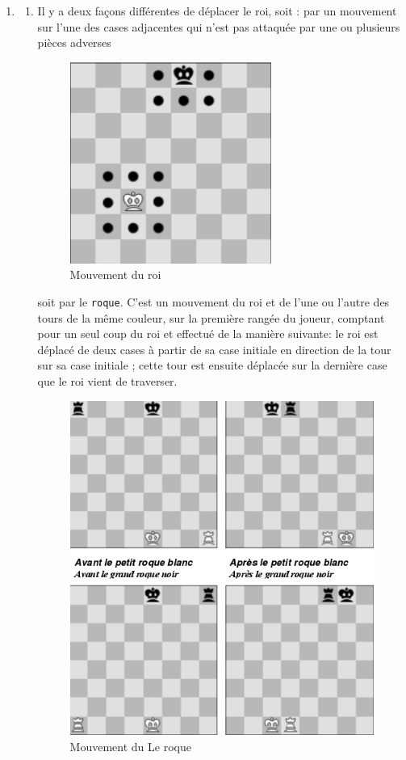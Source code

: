 \begin{enumerate}
\item
    \begin{enumerate}
    \item Il y a deux façons différentes de déplacer le roi, soit : par un mouvement sur l’une des cases adjacentes qui n’est pas attaquée par une ou plusieurs pièces adverses

    \begin{figure}[H]
        \centering
        \includegraphics[scale=0.5]{roi.png}
        \caption{Mouvement du roi}
    \end{figure}

    soit par le \texttt{roque}. C’est un mouvement du roi et de l’une ou l’autre des tours de la même couleur, sur la première rangée du joueur, comptant pour un seul coup du roi et effectué de la manière suivante: le roi est déplacé de deux cases à partir de sa case initiale en direction de la tour sur sa case initiale ; cette tour est ensuite déplacée sur la dernière case que le roi vient de traverser.
    \begin{figure}[H]
        \centering
        \includegraphics[scale=0.5]{roque.png}
        \caption{Mouvement du Le roque}
    \end{figure}


\end{enumerate}
\end{enumerate}
